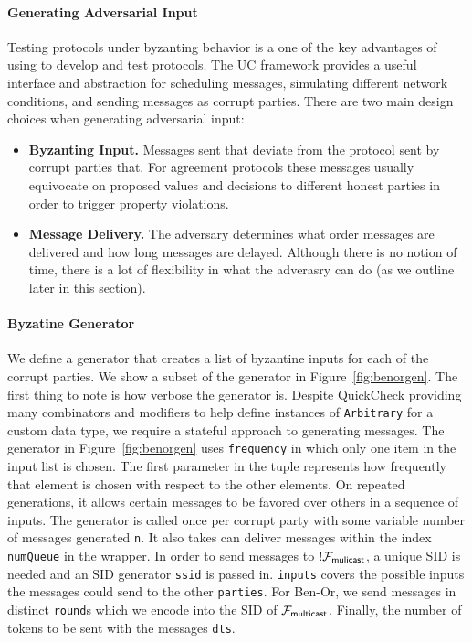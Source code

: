 \paragraph{Generating Adversarial Input}
Testing protocols under byzanting behavior is a one of the key advantages of using \us to develop and test protocols. 
The UC framework provides a useful interface and abstraction for scheduling messages, simulating different network conditions, and sending messages as corrupt parties.  
There are two main design choices when generating adversarial input:
\begin{itemize}
\item \textbf{Byzanting Input.} Messages sent that deviate from the protocol sent by corrupt parties that. For agreement protocols these messages usually equivocate on proposed values and decisions to different honest parties in order to trigger property violations.
\item \textbf{Message Delivery.} The adversary determines what order messages are delivered and how long messages are delayed. Although there is no notion of time, there is a lot of flexibility in what the adverasry can do (as we outline later in this section).
\end{itemize}

\paragraph{Byzatine Generator}
We define a generator that creates a list of byzantine inputs for each of the corrupt parties.
We show a subset of the generator in Figure~\ref{fig:benorgen}.
The first thing to note is how verbose the generator is.
Despite QuickCheck providing many combinators and modifiers to help define instances of \texttt{Arbitrary} for a custom data type, we require a stateful approach to generating messages.
The generator in Figure~\ref{fig:benorgen} uses \texttt{frequency} in which only one item in the input list is chosen. 
The first parameter in the tuple represents how frequently that element is chosen with respect to the other elements.
On repeated generations, it allows certain messages to be favored over others in a sequence of inputs.
The generator is called once per corrupt party with some variable number of messages generated \texttt{n}. It also takes can deliver messages within the index \texttt{numQueue} in the wrapper.
In order to send messages to $!\mathcal{F}_{{\mathsf {mulicast}}}$, a unique SID is needed and an SID generator \texttt{ssid} is passed in. 
\texttt{inputs} covers the possible inputs the messages could send to the other \texttt{parties}. For Ben-Or, we send messages in distinct \texttt{round}s which we encode into the SID of $\mathcal{F}_{{\mathsf {multicast}}}$. 
Finally, the number of tokens to be sent with the messages \texttt{dts}.

